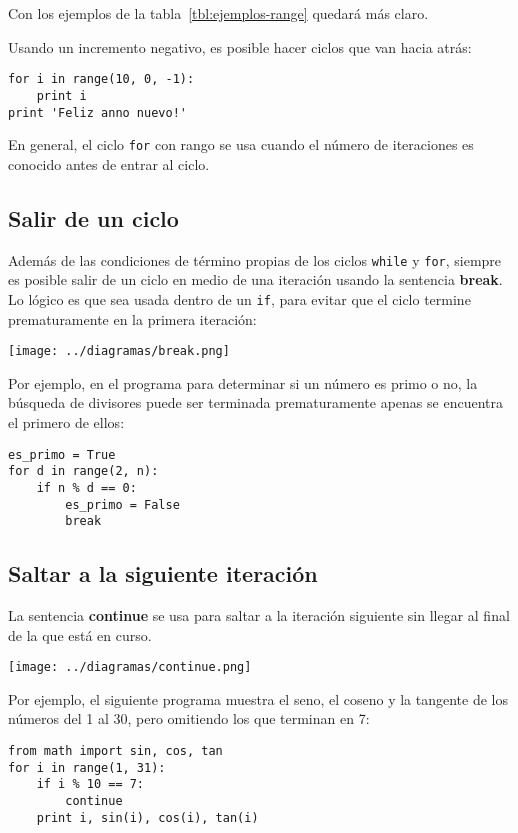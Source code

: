 Con los ejemplos de la tabla~\ref{tbl:ejemplos-range} quedará más claro.

Usando un incremento negativo, es posible hacer ciclos que van hacia
atrás:

\begin{lstlisting}
for i in range(10, 0, -1):
    print i
print 'Feliz anno nuevo!'
\end{lstlisting}

En general, el ciclo \lstinline!for! con rango se usa cuando el número
de iteraciones es conocido antes de entrar al ciclo.

\subsection{Salir de un ciclo}

Además de las condiciones de término propias de los ciclos
\lstinline!while! y \lstinline!for!, siempre es posible salir de un
ciclo en medio de una iteración usando la sentencia \textbf{break}. Lo
lógico es que sea usada dentro de un \lstinline!if!, para evitar que el
ciclo termine prematuramente en la primera iteración:

\texttt{[image: ../diagramas/break.png]}

Por ejemplo, en el programa para determinar si un número es primo o no,
la búsqueda de divisores puede ser terminada prematuramente apenas se
encuentra el primero de ellos:

\begin{lstlisting}
es_primo = True
for d in range(2, n):
    if n % d == 0:
        es_primo = False
        break
\end{lstlisting}

\subsection{Saltar a la siguiente iteración}

La sentencia \textbf{continue} se usa para saltar a la iteración
siguiente sin llegar al final de la que está en curso.

\texttt{[image: ../diagramas/continue.png]}

Por ejemplo, el siguiente programa muestra el seno, el coseno y la
tangente de los números del 1 al 30, pero omitiendo los que terminan en
7:

\begin{lstlisting}
from math import sin, cos, tan
for i in range(1, 31):
    if i % 10 == 7:
        continue
    print i, sin(i), cos(i), tan(i)
\end{lstlisting}

